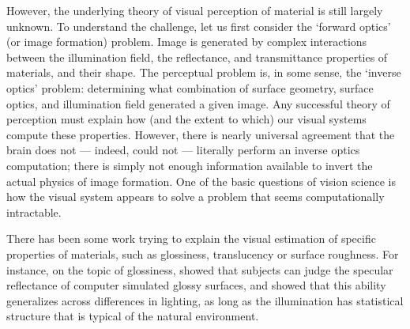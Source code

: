 
However, the underlying theory of visual perception of material is still largely unknown. To understand the challenge, let us first consider the `forward optics' (or image formation) problem. Image is generated by complex interactions between the illumination field, the reflectance, and transmittance properties of materials, and their shape. The perceptual problem is, in some sense, the `inverse optics' problem: determining what combination of surface geometry, surface optics, and illumination field generated a given image. Any successful theory of perception must explain how (and the extent to which) our visual systems compute these properties. However, there is nearly universal agreement that the brain does not — indeed, could not — literally perform an inverse optics computation; there is simply not enough information available to invert the actual physics of image formation. One of the basic questions of vision science is how the visual system appears to solve a problem that seems computationally intractable.

There has been some work trying to explain the visual estimation of specific properties of materials, such as glossiness, translucency or surface roughness. For instance, on the topic of glossiness, \citeauthor{nishida1998use} showed that subjects can judge the specular reflectance of computer simulated glossy surfaces, and \citeauthor{fleming2003real} showed that this ability generalizes across differences in lighting, as long as the illumination has statistical structure that is typical of the natural environment. \citeauthor{fleming2014visual}


